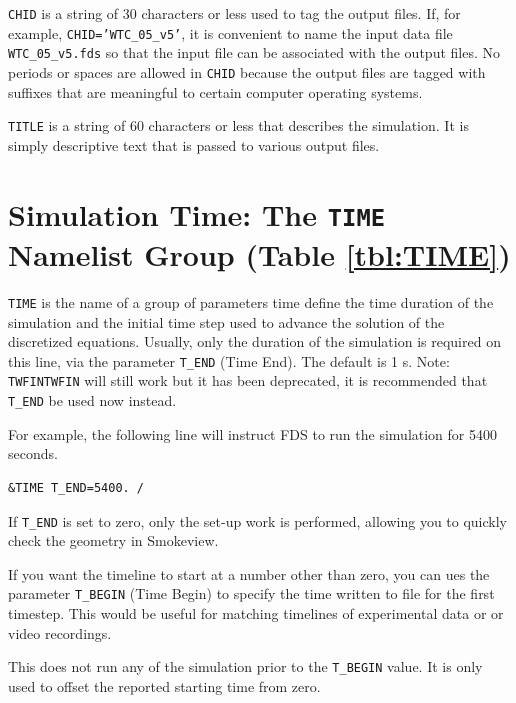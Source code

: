 \documentclass[11pt]{book}
\newcommand{\ct}{\tt\small}
\begin{document}
\begin{description}
\item {\ct CHID} is a string of 30 characters or less used to tag the output files.
If, for example, {\ct CHID='WTC\_05\_v5'}, it is convenient to
name the input data file {\ct WTC\_05\_v5.fds} so that the input file
can be associated with the output files. No periods or spaces are allowed in
{\ct CHID} because the output files are tagged with suffixes that
are meaningful to certain computer operating systems.
\item {\ct TITLE} is a string of 60 characters or less that describes the
simulation. It is simply descriptive text that is passed to various output files.
\end{description}


\section{Simulation Time: The \texorpdfstring{{\tt TIME}}{TIME} Namelist Group (Table \ref{tbl:TIME})}
\label{info:TIME}

{\ct TIME} is the name of a group of parameters time define the time
duration of the simulation and the initial time step used to advance
the solution of the discretized equations. Usually, only the
duration of the simulation is required on this line, via the
parameter {\ct T\_END} (Time End). The default is 1 s.
Note: {\ct TWFIN}{\ct TWFIN} will still work but it has been deprecated,
it is recommended that {\ct T\_END} be used now instead.

For example, the following line will instruct FDS to run the simulation for 5400 seconds.

\footnotesize
\begin{verbatim}
&TIME T_END=5400. /
\end{verbatim}

\normalsize
If {\ct T\_END} is set to zero, only the set-up work is performed,
allowing you to quickly check the geometry in Smokeview.

If you want the timeline to start at a number other than zero, you can ues the parameter
{\ct T\_BEGIN} (Time Begin) to specify the time written to file for the first timestep.
This would be useful for matching timelines of experimental data or or video recordings.

\begin{warning}
This does not run any of the simulation prior to the {\ct T\_BEGIN} value.
It is only used to offset the reported starting time from zero.
\end{warning}
\end{document}
